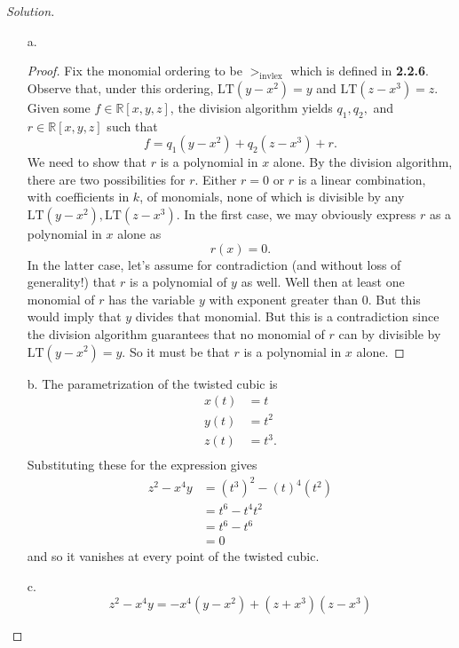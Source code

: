 \documentclass[]{article}
\newcommand\<{\langle}
\renewcommand\>{\rangle}
\newcommand{\RR}{\ensuremath{\mathbb{R}}}
\newenvironment{solution}
{
	\begin{proof}[Solution] \text{ }
		\\
	}
	{
	\end{proof}
}
\begin{document}
\begin{solution}
		\begin{enumerate}
		\item[a.]
		\begin{proof}
			Fix the monomial ordering to be $>_\text{invlex}$ which is defined in \textbf{2.2.6}. Observe that, under this ordering, $\text{LT}\left(y-x^2\right) = y$ and $\text{LT}\left(z-x^3\right) = z$. Given some $f \in \RR[x,y,z]$, the division algorithm yields $q_1, q_2,$ and $r \in \RR[x, y, z]$ such that
			$$
				f = q_1\left(y-x^2\right) + q_2\left(z-x^3\right) + r.
			$$
			We need to show that $r$ is a polynomial in $x$ alone. By the division algorithm, there are two possibilities for $r$. Either $r = 0$ or $r$ is a linear combination, with coefficients in $k$, of monomials, none of which is divisible by any $\text{LT}\left(y-x^2\right), \text{LT}\left(z-x^3\right)$. In the first case, we may obviously express $r$ as a polynomial in $x$ alone as
			$$
				r(x) = 0.
			$$
			In the latter case, let's assume for contradiction (and without loss of generality!) that $r$ is a polynomial of $y$ as well. Well then at least one monomial of $r$ has the variable $y$ with exponent greater than 0. But this would imply that $y$ divides that monomial. But this is a contradiction since the division algorithm guarantees that no monomial of $r$ can by divisible by $\text{LT}\left(y-x^2\right) = y$. So it must be that $r$ is a polynomial in $x$ alone.
		\end{proof}
		\item[b.] The parametrization of the twisted cubic is
		\begin{align*}
			x(t) &= t   \\
			y(t) &= t^2 \\
			z(t) &= t^3. \\
		\end{align*}
		Substituting these for the expression gives
		\begin{align*}
			z^2 - x^4y &= \left(t^3\right)^2 - \left(t\right)^4\left(t^2\right) \\
			&= t^6 - t^4t^2 \\
			&= t^6 - t^6 \\
			&= 0
		\end{align*}
		and so it vanishes at every point of the twisted cubic.
		\item[c.] 
		$$
			z^2 - x^4y = -x^4\left(y - x^2\right) + \left(z + x^3\right)\left(z - x^3\right)
		$$
	\end{enumerate}
\end{solution}
\end{document}
